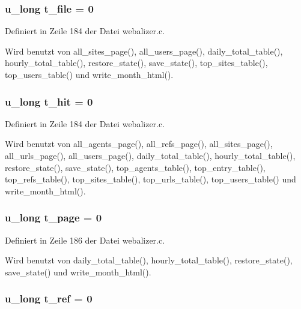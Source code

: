 \subsubsection{\setlength{\rightskip}{0pt plus 5cm}u\_\-long {\bf t\_\-file} = 0}\label{webalizer_8c_8d8f1b3ebaff4207130ee4e068a74578}




Definiert in Zeile 184 der Datei webalizer.c.

Wird benutzt von all\_\-sites\_\-page(), all\_\-users\_\-page(), daily\_\-total\_\-table(), hourly\_\-total\_\-table(), restore\_\-state(), save\_\-state(), top\_\-sites\_\-table(), top\_\-users\_\-table() und write\_\-month\_\-html().
\subsubsection{\setlength{\rightskip}{0pt plus 5cm}u\_\-long {\bf t\_\-hit} = 0}\label{webalizer_8c_4f0e430951167c36ff37f1373c453d40}




Definiert in Zeile 184 der Datei webalizer.c.

Wird benutzt von all\_\-agents\_\-page(), all\_\-refs\_\-page(), all\_\-sites\_\-page(), all\_\-urls\_\-page(), all\_\-users\_\-page(), daily\_\-total\_\-table(), hourly\_\-total\_\-table(), restore\_\-state(), save\_\-state(), top\_\-agents\_\-table(), top\_\-entry\_\-table(), top\_\-refs\_\-table(), top\_\-sites\_\-table(), top\_\-urls\_\-table(), top\_\-users\_\-table() und write\_\-month\_\-html().
\subsubsection{\setlength{\rightskip}{0pt plus 5cm}u\_\-long {\bf t\_\-page} = 0}\label{webalizer_8c_dab177cb0d83726239072547f166262a}




Definiert in Zeile 186 der Datei webalizer.c.

Wird benutzt von daily\_\-total\_\-table(), hourly\_\-total\_\-table(), restore\_\-state(), save\_\-state() und write\_\-month\_\-html().
\subsubsection{\setlength{\rightskip}{0pt plus 5cm}u\_\-long {\bf t\_\-ref} = 0}\label{webalizer_8c_54f4adcbb2769b5082a138f23c9bb07e}




